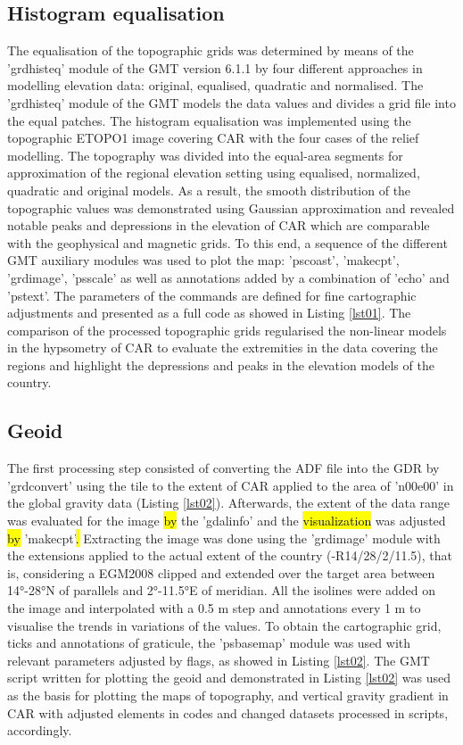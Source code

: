 \documentclass[minerals,article,submit,pdftex,moreauthors]{Definitions/mdpi}
\begin{document}
\subsection{Histogram equalisation}

The equalisation of the topographic grids was determined by means of the 'grdhisteq' module of the GMT version 6.1.1 \cite{WesselSmith1991,Wessel} by four different approaches in modelling elevation data: original, equalised, quadratic and normalised. The ’grdhisteq’ module of the GMT models the data values and divides a grid file into the equal patches. The histogram equalisation was implemented using the topographic ETOPO1 image covering CAR with the four cases of the relief modelling. The topography was divided into the equal-area segments for approximation of the regional elevation setting using equalised, normalized, quadratic and original models. As a result, the smooth distribution of the topographic values was demonstrated using Gaussian approximation and revealed notable peaks and depressions in the elevation of CAR which are comparable with the geophysical and magnetic grids. To this end, a sequence of the different GMT auxiliary modules was used to plot the map: 'pscoast', 'makecpt', 'grdimage', 'psscale' as well as annotations added by a combination of 'echo' and 'pstext'. The parameters of the commands are defined for fine cartographic adjustments and presented as a full code as showed in Listing \ref{lst01}. The comparison of the processed topographic grids regularised the non-linear models in the hypsometry of CAR to evaluate the extremities in the data covering the regions and highlight the depressions and peaks in the elevation models of the country.

\subsection{Geoid}
The first processing step consisted of converting the ADF file into the GDR by 'grdconvert' using the tile to the extent of CAR applied to the area of 'n00e00' in the global gravity data (Listing \ref{lst02}). Afterwards, the extent of the data range was evaluated for the image \hl{by} the 'gdalinfo'\hl{ }and the \hl{visualization} was adjusted\hl{ by} 'makecpt'\hl{. }Extracting the image was done using the 'grdimage' module with the extensions applied to the actual extent of the country (-R14/28/2/11.5), that is, considering a EGM2008 clipped and extended over the target area between 14°-28°N of parallels and 2°-11.5°E of meridian. All the isolines were added on the image and interpolated with a 0.5 m step and annotations every 1 m to visualise the trends in variations of the values. To obtain the cartographic grid, ticks and annotations of graticule, the 'psbasemap' module was used with relevant parameters adjusted by flags, as showed in Listing \ref{lst02}.\hl{ }The GMT script written for plotting the geoid and demonstrated in Listing \ref{lst02} was used as the basis for plotting the maps of topography, and vertical gravity gradient in CAR with adjusted elements in codes and changed datasets processed in scripts, accordingly.
\end{document}
